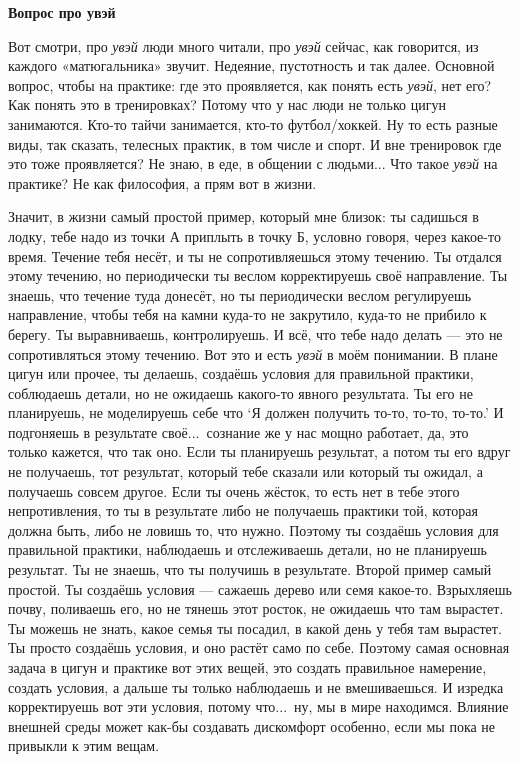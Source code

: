 \null
\centerline{\bf Вопрос про увэй}
\null

\A
Вот смотри, про {\it увэй\/} люди много читали, про {\it увэй\/} сейчас, как говорится, из каждого
«матюгальника» звучит. Недеяние,
пустотность и так далее.
Основной вопрос, чтобы на практике: где это проявляется, как понять есть {\it увэй}, нет его?
Как
понять это в тренировках?
Потому что у нас люди не только цигун занимаются. Кто-то тайчи занимается, кто-то футбол/хоккей.
Ну то есть
разные виды, так сказать, телесных практик, в том числе и спорт. И вне тренировок где это тоже
проявляется? Не знаю, в
еде, в общении с людьми... Что такое {\it увэй\/} на практике? Не как философия, а прям вот в жизни.

\T
Значит, в жизни самый простой пример, который мне близок: ты садишься в лодку, тебе надо из
точки А приплыть в
точку Б, условно говоря, через какое-то время. Течение тебя несёт, и ты не сопротивляешься этому
течению. Ты отдался этому
течению, но периодически ты веслом корректируешь своё направление. Ты знаешь, что течение
туда донесёт, но ты
периодически веслом регулируешь направление, чтобы тебя на камни куда-то не закрутило,
куда-то не прибило к
берегу.
Ты выравниваешь, контролируешь. И всё, что тебе надо делать --- это не сопротивляться этому
течению. Вот это и есть {\it увэй\/} в
моём понимании. В плане цигун или прочее, ты делаешь, создаёшь условия для
правильной практики,
соблюдаешь детали, но не ожидаешь какого-то явного результата.
Ты его не планируешь,
не моделируешь себе что `Я должен получить то-то, то-то, то-то.'\hfil\break
\indent
И подгоняешь в результате своё...\ сознание же у нас мощно работает, да, это только кажется, что
так оно. Если ты
планируешь результат, а потом ты его вдруг не получаешь, тот результат, который тебе сказали
или который ты ожидал, а
получаешь совсем другое.
Если ты очень жёсток, то есть нет в тебе этого непротивления, то ты в результате либо не
получаешь практики той, которая
должна быть, либо не ловишь то, что нужно.
Поэтому ты создаёшь условия для правильной практики,
наблюдаешь и
отслеживаешь детали, но не планируешь результат. Ты не знаешь, что ты получишь в
результате.\hfil\break
\indent
Второй
пример самый простой. Ты создаёшь условия --- сажаешь дерево или семя какое-то. Взрыхляешь
почву, поливаешь
его, но не тянешь этот росток, не ожидаешь что там вырастет.
Ты можешь не знать, какое семья ты посадил, в какой день у тебя там вырастет. Ты просто
создаёшь условия, и
оно растёт само по себе.\hfil\break
\indent
Поэтому самая основная задача в цигун и практике вот этих вещей, это
создать правильное
намерение, создать условия, а дальше ты только наблюдаешь и не вмешиваешься.
И изредка корректируешь вот эти условия, потому что...\ ну, мы в мире находимся.
Влияние внешней среды может
как-бы создавать дискомфорт особенно, если мы пока не привыкли к этим вещам.

